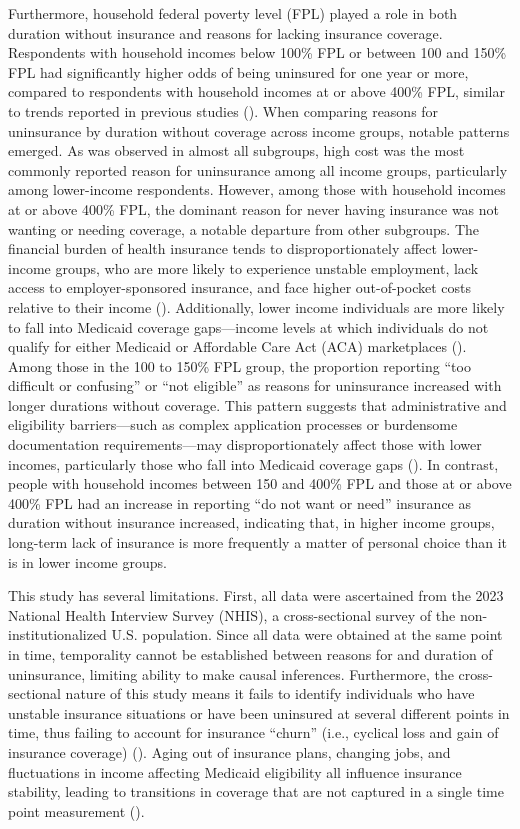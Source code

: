 \documentclass[12pt]{article}
\begin{document}
Furthermore, household federal poverty level (FPL) played a role in both duration without insurance and reasons for lacking insurance coverage. Respondents with household incomes below 100\% FPL or between 100 and 150\% FPL had significantly higher odds of being uninsured for one year or more, compared to respondents with household incomes at or above 400\% FPL, similar to trends reported in previous studies (\cite{lee_convergence_2021}). When comparing reasons for uninsurance by duration without coverage across income groups, notable patterns emerged. As was observed in almost all subgroups, high cost was the most commonly reported reason for uninsurance among all income groups, particularly among lower-income respondents. However, among those with household incomes at or above 400\% FPL, the dominant reason for never having insurance was not wanting or needing coverage, a notable departure from other subgroups. The financial burden of health insurance tends to disproportionately affect lower-income groups, who are more likely to experience unstable employment, lack access to employer-sponsored insurance, and face higher out-of-pocket costs relative to their income (\cite{einav_risk_2023}). Additionally, lower income individuals are more likely to fall into Medicaid coverage gaps—income levels at which individuals do not qualify for either Medicaid or Affordable Care Act (ACA) marketplaces (\cite{lukens_closing_2024}). Among those in the 100 to 150\% FPL group, the proportion reporting “too difficult or confusing” or “not eligible” as reasons for uninsurance increased with longer durations without coverage. This pattern suggests that administrative and eligibility barriers—such as complex application processes or burdensome documentation requirements—may disproportionately affect those with lower incomes, particularly those who fall into Medicaid coverage gaps (\cite{ericson_reducing_nodate}). In contrast, people with household incomes between 150 and 400\% FPL and those at or above 400\% FPL had an increase in reporting “do not want or need” insurance as duration without insurance increased, indicating that, in higher income groups, long-term lack of insurance is more frequently a matter of personal choice than it is in lower income groups.

This study has several limitations. First, all data were ascertained from the 2023 National Health Interview Survey (NHIS), a cross-sectional survey of the non-institutionalized U.S. population. Since all data were obtained at the same point in time, temporality cannot be established between reasons for and duration of uninsurance, limiting ability to make causal inferences. Furthermore, the cross-sectional nature of this study means it fails to identify individuals who have unstable insurance situations or have been uninsured at several different points in time, thus failing to account for insurance “churn” (i.e., cyclical loss and gain of insurance coverage) (\cite{collins_potential_2018, einav_risk_2023}). Aging out of insurance plans, changing jobs, and fluctuations in income affecting Medicaid eligibility all influence insurance stability, leading to transitions in coverage that are not captured in a single time point measurement (\cite{collins_potential_2018}).
\end{document}
